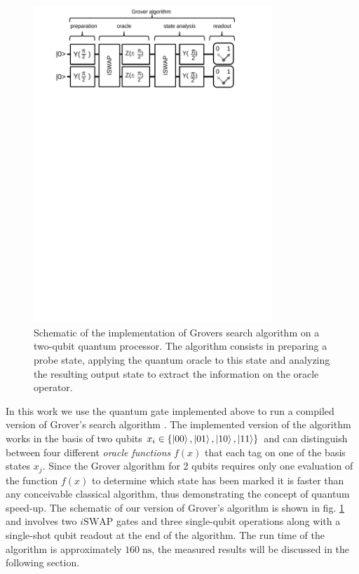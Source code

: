 \begin{figure}[ht!]
	\centering
		\includegraphics[width=0.8\textwidth]{./material/papers/grover/figures/grover_algorithm_schematic}
	\caption[Schematic of the implementation of Grovers search algorithm]{Schematic of the implementation of Grovers search algorithm on a two-qubit quantum processor. The algorithm consists in preparing a probe state, applying the quantum oracle to this state and analyzing the resulting output state to extract the information on the oracle operator.} 
	\label{fig:grover_algorithm_schematic}
\end{figure}

In this work we use the quantum gate implemented above to run a compiled version of Grover's search algorithm \citep{Grover_Quantum_1997}. The implemented version of the algorithm works in the basis of two qubits $x_i \in \{\left| 00 \right>,\left| 01 \right>,\left| 10 \right>,\left| 11 \right>\}$ and  can distinguish between four different {\it oracle functions} $f(x)$ that each tag on one of the basis states $x_j$. Since the Grover algorithm for 2 qubits requires only one evaluation of the function $f(x)$ to determine which state has been marked it is faster than any conceivable classical algorithm, thus demonstrating the concept of quantum speed-up. The schematic of our version of Grover's algorithm is shown in fig. \ref{fig:grover_algorithm_schematic} and involves two $i\mathrm{SWAP}$ gates and three single-qubit operations along with a single-shot qubit readout at the end of the algorithm. The run time of the algorithm is approximately $160\;\mathrm{ns}$, the measured results will be discussed in the following section. 

